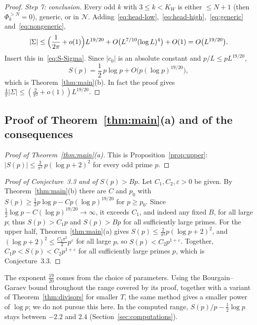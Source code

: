 \begin{proof}
\smallskip
\emph{Step 7: conclusion.} Every odd $k$ with $3\le k<K_W$ is either $\le N+1$ (then $\Phi_k^{>N}=0$), generic, or in $\mathcal N$. Adding~\eqref{eq:head-low},~\eqref{eq:head-high},~\eqref{eq:generic} and~\eqref{eq:nongeneric},
\[
|\Sigma|\le\Bigl(\frac1{2\pi}+o(1)\Bigr)L^{19/20}+O\bigl(L^{7/10}(\log L)^4\bigr)+O(1)=O\bigl(L^{19/20}\bigr).
\]
Insert this in~\eqref{eq:S-Sigma}. Since $|c_0|$ is an absolute constant and $p/L\le pL^{19/20}$,
\[
S(p)=\frac12\,p\log p+O\bigl(p(\log p)^{19/20}\bigr),
\]
which is Theorem~\ref{thm:main}(b). In fact the proof gives $\frac{4}{\pi}|\Sigma|\le(\frac2{\pi^2}+o(1))L^{19/20}$.
\end{proof}

\subsection{Proof of Theorem~\ref{thm:main}(a) and of the consequences}

\begin{proof}[Proof of Theorem~\ref{thm:main}(a)]
This is Proposition~\ref{prop:upper}: $|S(p)|\le\frac2{\pi^2}\,p(\log p+2)^2$ for every odd prime $p$.
\end{proof}

\begin{proof}[Proof of Conjecture~3.3 and of $S(p)>Bp$]
Let $C_1,C_2,\varepsilon>0$ be given. By Theorem~\ref{thm:main}(b) there are $C$ and $p_0$ with $S(p)\ge\frac12p\log p-Cp(\log p)^{19/20}$ for $p\ge p_0$. Since $\frac12\log p-C(\log p)^{19/20}\to\infty$, it exceeds $C_1$, and indeed any fixed $B$, for all large $p$; thus $S(p)>C_1p$ and $S(p)>Bp$ for all sufficiently large primes. For the upper half, Theorem~\ref{thm:main}(a) gives $S(p)\le\frac2{\pi^2}p(\log p+2)^2$, and $(\log p+2)^2\le\frac{C_2\pi^2}2p^{\varepsilon}$ for all large $p$, so $S(p)<C_2p^{1+\varepsilon}$. Together, $C_1p<S(p)<C_2p^{1+\varepsilon}$ for all sufficiently large primes $p$, which is Conjecture~3.3.
\end{proof}

\begin{remark}\label{rem:sharper}
The exponent $\frac{19}{20}$ comes from the choice of parameters. Using the Bourgain--Garaev bound throughout the range covered by its proof, together with a variant of Theorem~\ref{thm:divisors} for smaller $T$, the same method gives a smaller power of $\log p$; we do not pursue this here. In the computed range, $S(p)/p-\frac12\log p$ stays between $-2.2$ and $2.4$ (Section~\ref{sec:computations}).
\end{remark}

